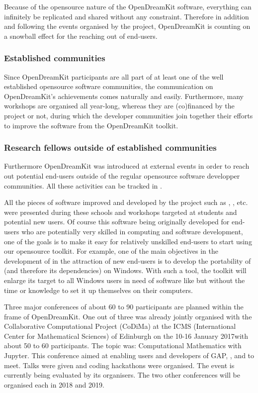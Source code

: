 \documentclass{deliverablereport}
\begin{document}
Because of the opensource nature of the OpenDreamKit software, everything can infinitely be replicated and shared without any constraint. Therefore in addition and following the events organised by the project, OpenDreamKit is counting on a snowball effect for the reaching out of end-users.



\subsubsection{Established communities}

Since OpenDreamKit participants are all part of at least one of the well established opensource software communities, the communication on OpenDreamKit's achievements comes naturally and easily. Furthermore, many workshops are organised all year-long, whereas they are (co)financed by the project or not, during which the developer communities join together their efforts to improve the software from the OpenDreamKit toolkit. 

\subsubsection{Research fellows outside of established communities}

Furthermore OpenDreamKit was introduced at external events in order to reach out potential end-users outside of the regular opensource software developper communities.
All these activities can be tracked in . 


All the pieces of software improved and developed by the project such as \Sage, \Singular, etc. were presented during these schools and workshops targeted at students and potential new users. Of course this software being originally developed for end-users who are potentially very skilled in computing and software development, one of the goals is to make it easy  for relatively unskilled end-users to start using our opensource toolkit. 
For example, one of the main objectives in the development of \Sage in the attraction of new end-users is to develop the portability of \Sage (and therefore its dependencies) on Windows. With such a tool, the toolkit will enlarge its target to all Windows users in need of software like \Sage but without the time or knowledge to set it up themselves on their computers.

Three major conferences of about 60 to 90 participants are planned within the frame of OpenDreamKit. One out of three was already jointly organised with the Collaborative Computational Project (CoDiMa) at the ICMS (International Center for Mathematical Sciences) of Edinburgh on the 10-16 January 2017with about 50 to 60 participants. The topic was: Computational Mathematics with Jupyter. This conference aimed at enabling users and developers of GAP, \Singular, \Sage and \Jupyter to meet. Talks were given and coding hackathons were organised. The event is currently being evaluated by its organisers. 
The two other conferences will be organised each in 2018 and 2019.

\end{document}
